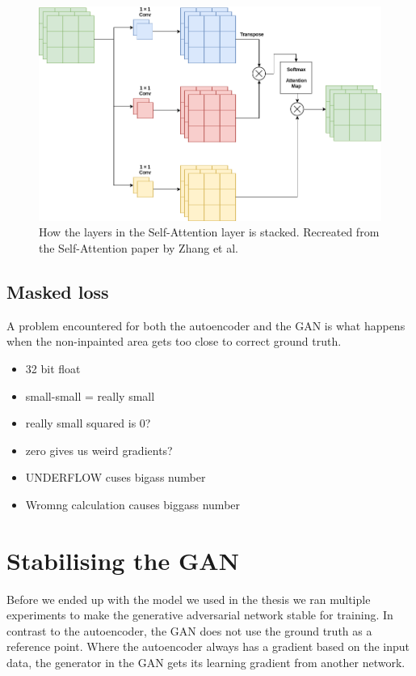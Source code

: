 \begin{figure}[h]
\centering
\includegraphics[scale=0.4]{methodology/figures/attention.png}
\caption{How the layers in the Self-Attention layer is stacked. Recreated from the Self-Attention  paper by Zhang et al.~\cite{DBLP:journals/corr/selfattention}}
\label{fig:Attention}
\end{figure}



\subsection{Masked loss}
A problem encountered for both the autoencoder and the GAN is what happens when the non-inpainted area gets too close to correct ground truth. 

\begin{itemize}
	\item 32 bit float
	\item small-small = really small
	\item really small squared is 0?
	\item zero gives us weird gradients?
	\item UNDERFLOW cuses bigass number
	\item Wromng calculation causes biggass number
\end{itemize}





\section{Stabilising the GAN}
Before we ended up with the model we used in the thesis we ran multiple experiments to make the generative adversarial network stable for training. 
In contrast to the autoencoder, the GAN does not use the ground truth as a reference point. Where the autoencoder always has a gradient based on the input data, the generator in the GAN gets its learning gradient from another network.

